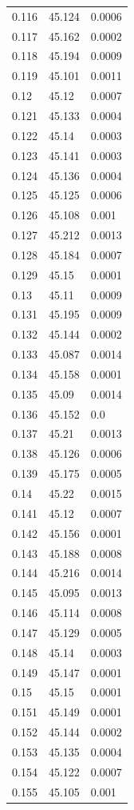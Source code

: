 \begin{table}[H]
\begin{tabular}{lll}
0.116 & 45.124 & 0.0006 \\
0.117 & 45.162 & 0.0002 \\
0.118 & 45.194 & 0.0009 \\
0.119 & 45.101 & 0.0011 \\
0.12 & 45.12 & 0.0007 \\
0.121 & 45.133 & 0.0004 \\
0.122 & 45.14 & 0.0003 \\
0.123 & 45.141 & 0.0003 \\
0.124 & 45.136 & 0.0004 \\
0.125 & 45.125 & 0.0006 \\
0.126 & 45.108 & 0.001 \\
0.127 & 45.212 & 0.0013 \\
0.128 & 45.184 & 0.0007 \\
0.129 & 45.15 & 0.0001 \\
0.13 & 45.11 & 0.0009 \\
0.131 & 45.195 & 0.0009 \\
0.132 & 45.144 & 0.0002 \\
0.133 & 45.087 & 0.0014 \\
0.134 & 45.158 & 0.0001 \\
0.135 & 45.09 & 0.0014 \\
0.136 & 45.152 & 0.0 \\
0.137 & 45.21 & 0.0013 \\
0.138 & 45.126 & 0.0006 \\
0.139 & 45.175 & 0.0005 \\
0.14 & 45.22 & 0.0015 \\
0.141 & 45.12 & 0.0007 \\
0.142 & 45.156 & 0.0001 \\
0.143 & 45.188 & 0.0008 \\
0.144 & 45.216 & 0.0014 \\
0.145 & 45.095 & 0.0013 \\
0.146 & 45.114 & 0.0008 \\
0.147 & 45.129 & 0.0005 \\
0.148 & 45.14 & 0.0003 \\
0.149 & 45.147 & 0.0001 \\
0.15 & 45.15 & 0.0001 \\
0.151 & 45.149 & 0.0001 \\
0.152 & 45.144 & 0.0002 \\
0.153 & 45.135 & 0.0004 \\
0.154 & 45.122 & 0.0007 \\
0.155 & 45.105 & 0.001 \\

\end{tabular}
\end{table}
